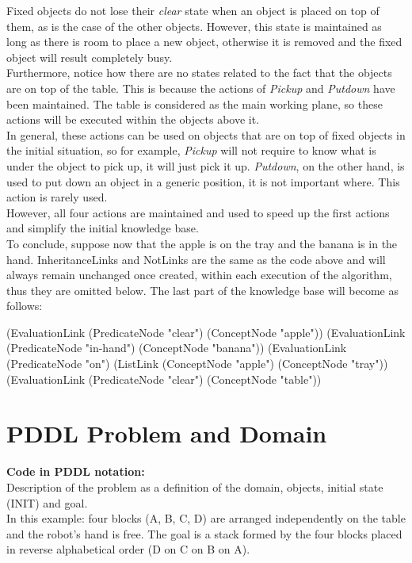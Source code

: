 Fixed objects do not lose their \textit{clear} state when an object is placed on top of them, as is the case of the other objects. However, this state is maintained as long as there is room to place a new object, otherwise it is removed and the fixed object will result completely busy. \\
Furthermore, notice how there are no states related to the fact that the objects are on top of the table. This is because the actions of \textit{Pickup} and \textit{Putdown} have been maintained. The table is considered as the main working plane, so these actions will be executed within the objects above it. \\
In general, these actions can be used on objects that are on top of fixed objects in the initial situation, so for example, \textit{Pickup} will not require to know what is under the object to pick up, it will just pick it up. \textit{Putdown}, on the other hand, is used to put down an object in a generic position, it is not important where. This action is rarely used. \\
However, all four actions are maintained and used to speed up the first actions and simplify the initial knowledge base.\\

To conclude, suppose now that the apple is on the tray and the banana is in the hand. InheritanceLinks and NotLinks are the same as the code above and will always remain unchanged once created, within each execution of the algorithm, thus they are omitted below. The last part of the knowledge base will become as follows: \\

\begin{python}	
	(EvaluationLink
		(PredicateNode "clear")
		(ConceptNode "apple"))
	(EvaluationLink
		(PredicateNode "in-hand")
		(ConceptNode "banana"))
	(EvaluationLink
		(PredicateNode "on")
		(ListLink
			(ConceptNode "apple")
			(ConceptNode "tray"))
	(EvaluationLink
		(PredicateNode "clear")
		(ConceptNode "table"))
\end{python}


\section{PDDL Problem and Domain}\label{sec:PDDL} 

\begin{footnotesize}
\textbf{Code in PDDL notation:} \\
Description of the problem as a definition of the domain, objects, initial state (INIT) and goal. \\
In this example: four blocks (A, B, C, D) are arranged independently on the table and the robot's hand is free. The goal is a stack formed by the four blocks placed in reverse alphabetical order (D on C on B on A).
\end{footnotesize}

